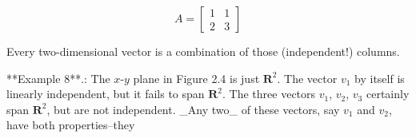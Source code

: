 \[A=\begin{bmatrix}1&1\\ 2&3\end{bmatrix}\]

Every two-dimensional vector is a combination of those (independent!) columns.

**Example 8**.: The \(x\)-\(y\) plane in Figure 2.4 is just \(\mathbf{R}^{2}\). The vector \(v_{1}\) by itself is linearly independent, but it fails to span \(\mathbf{R}^{2}\). The three vectors \(v_{1}\), \(v_{2}\), \(v_{3}\) certainly span \(\mathbf{R}^{2}\), but are not independent. _Any two_ of these vectors, say \(v_{1}\) and \(v_{2}\), have both properties--they